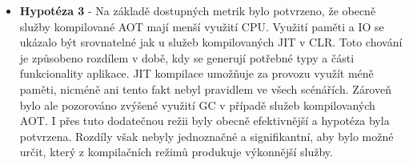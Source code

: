 \begin{itemize}
  \item \textbf{Hypotéza 3} - Na základě dostupných metrik bylo potvrzeno, že obecně služby kompilované AOT mají menší využití CPU. Využití paměti a IO se ukázalo být srovnatelné jak u služeb kompilovaných JIT v CLR. Toto chování je způsobeno rozdílem v době, kdy se generují potřebné typy a části funkcionality aplikace. JIT kompilace umožňuje za provozu využít méně paměti, nicméně ani tento fakt nebyl pravidlem ve všech scénářích. Zároveň bylo ale pozorováno zvýšené využití GC v případě služeb kompilovaných AOT. I přes tuto dodatečnou režii byly obecně efektivnější a hypotéza byla potvrzena. Rozdíly však nebyly jednoznačné a signifikantní, aby bylo možné určit, který z kompilačních režimů produkuje výkonnější služby. 
\end{itemize}